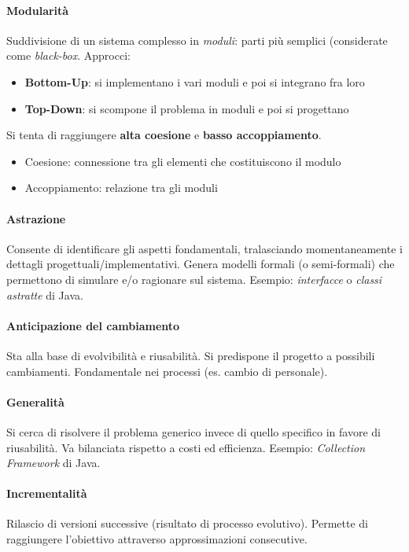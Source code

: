 \paragraph{Modularità} Suddivisione di un sistema complesso in \textit{moduli}: parti più semplici (considerate come \textit{black-box}. Approcci:
\begin{itemize}
    \item \textbf{Bottom-Up}: si implementano i vari moduli e poi si integrano fra loro
    \item \textbf{Top-Down}: si scompone il problema in moduli e poi si progettano
\end{itemize}
Si tenta di raggiungere \textbf{alta coesione} e \textbf{basso accoppiamento}.
\begin{itemize}
    \item Coesione: connessione tra gli elementi che costituiscono il modulo
    \item Accoppiamento: relazione tra gli moduli
\end{itemize}

\paragraph{Astrazione} Consente di identificare gli aspetti fondamentali, tralasciando momentaneamente i dettagli progettuali/implementativi. Genera modelli formali (o semi-formali) che permettono di simulare e/o ragionare sul sistema. Esempio: \textit{interfacce} o \textit{classi astratte} di Java.

\paragraph{Anticipazione del cambiamento} Sta alla base di evolvibilità e riusabilità. Si predispone il progetto a possibili cambiamenti. Fondamentale nei processi (es. cambio di personale).

\paragraph{Generalità} Si cerca di risolvere il problema generico invece di quello specifico in favore di riusabilità. Va bilanciata rispetto a costi ed efficienza. Esempio: \textit{Collection Framework} di Java.

\paragraph{Incrementalità} Rilascio di versioni successive (risultato di processo evolutivo). Permette di raggiungere l'obiettivo attraverso approssimazioni consecutive.

